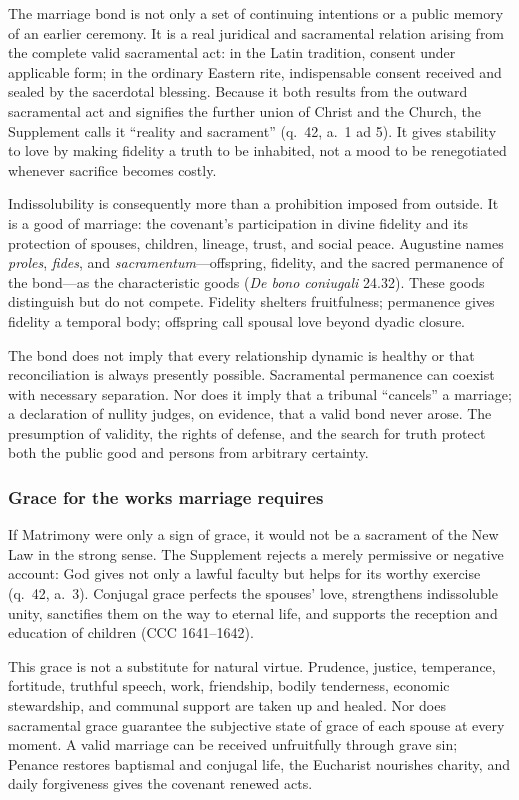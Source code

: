 The marriage bond is not only a set of continuing intentions or a public memory of an earlier ceremony. It is a real juridical and sacramental relation arising from the complete valid sacramental act: in the Latin tradition, consent under applicable form; in the ordinary Eastern rite, indispensable consent received and sealed by the sacerdotal blessing. Because it both results from the outward sacramental act and signifies the further union of Christ and the Church, the Supplement calls it ``reality and sacrament'' (q.~42, a.~1 ad 5). It gives stability to love by making fidelity a truth to be inhabited, not a mood to be renegotiated whenever sacrifice becomes costly.

Indissolubility is consequently more than a prohibition imposed from outside. It is a good of marriage: the covenant's participation in divine fidelity and its protection of spouses, children, lineage, trust, and social peace. Augustine names \emph{proles}, \emph{fides}, and \emph{sacramentum}---offspring, fidelity, and the sacred permanence of the bond---as the characteristic goods (\emph{De bono coniugali} 24.32). These goods distinguish but do not compete. Fidelity shelters fruitfulness; permanence gives fidelity a temporal body; offspring call spousal love beyond dyadic closure.

The bond does not imply that every relationship dynamic is healthy or that reconciliation is always presently possible. Sacramental permanence can coexist with necessary separation. Nor does it imply that a tribunal ``cancels'' a marriage; a declaration of nullity judges, on evidence, that a valid bond never arose. The presumption of validity, the rights of defense, and the search for truth protect both the public good and persons from arbitrary certainty.

\subsubsection{Grace for the works marriage requires}

If Matrimony were only a sign of grace, it would not be a sacrament of the New Law in the strong sense. The Supplement rejects a merely permissive or negative account: God gives not only a lawful faculty but helps for its worthy exercise (q.~42, a.~3). Conjugal grace perfects the spouses' love, strengthens indissoluble unity, sanctifies them on the way to eternal life, and supports the reception and education of children (CCC 1641--1642).

This grace is not a substitute for natural virtue. Prudence, justice, temperance, fortitude, truthful speech, work, friendship, bodily tenderness, economic stewardship, and communal support are taken up and healed. Nor does sacramental grace guarantee the subjective state of grace of each spouse at every moment. A valid marriage can be received unfruitfully through grave sin; Penance restores baptismal and conjugal life, the Eucharist nourishes charity, and daily forgiveness gives the covenant renewed acts.


